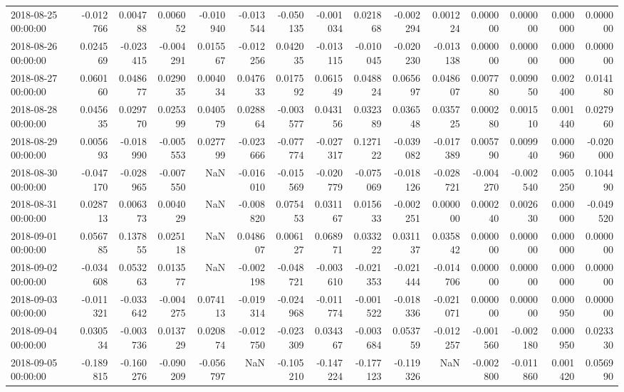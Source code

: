 \begin{tabular}{lrrrrrrrrrrrrrr}
2018-08-25 00:00:00 & -0.012766 & 0.004788 & 0.006052 & -0.010940 & -0.013544 & -0.050135 & -0.001034 & 0.021868 & -0.002294 & 0.001224 & 0.000000 & 0.000000 & 0.000000 & 0.000000 \\
2018-08-26 00:00:00 & 0.024569 & -0.023415 & -0.004291 & 0.015567 & -0.012256 & 0.042035 & -0.013115 & -0.010045 & -0.020230 & -0.013138 & 0.000000 & 0.000000 & 0.000000 & 0.000000 \\
2018-08-27 00:00:00 & 0.060160 & 0.048677 & 0.029035 & 0.004034 & 0.047633 & 0.017592 & 0.061549 & 0.048824 & 0.065697 & 0.048607 & 0.007780 & 0.009050 & 0.002400 & 0.014180 \\
2018-08-28 00:00:00 & 0.045635 & 0.029770 & 0.025399 & 0.040579 & 0.028864 & -0.003577 & 0.043156 & 0.032389 & 0.036548 & 0.035725 & 0.000280 & 0.001510 & 0.001440 & 0.027960 \\
2018-08-29 00:00:00 & 0.005693 & -0.018990 & -0.005553 & 0.027799 & -0.023666 & -0.077774 & -0.027317 & 0.127122 & -0.039082 & -0.017389 & 0.005790 & 0.009940 & 0.000960 & -0.020000 \\
2018-08-30 00:00:00 & -0.047170 & -0.028965 & -0.007550 & NaN & -0.016010 & -0.015569 & -0.020779 & -0.075069 & -0.018126 & -0.028721 & -0.004270 & -0.002540 & 0.005250 & 0.104490 \\
2018-08-31 00:00:00 & 0.028713 & 0.006373 & 0.004029 & NaN & -0.008820 & 0.075453 & 0.031167 & 0.015633 & -0.002251 & 0.000000 & 0.000240 & 0.002630 & 0.000000 & -0.049520 \\
2018-09-01 00:00:00 & 0.056785 & 0.137855 & 0.025118 & NaN & 0.048607 & 0.006127 & 0.068971 & 0.033222 & 0.031137 & 0.035842 & 0.000000 & 0.000000 & 0.000000 & 0.000000 \\
2018-09-02 00:00:00 & -0.034608 & 0.053263 & 0.013577 & NaN & -0.002198 & -0.048721 & -0.003610 & -0.021353 & -0.021444 & -0.014706 & 0.000000 & 0.000000 & 0.000000 & 0.000000 \\
2018-09-03 00:00:00 & -0.011321 & -0.033642 & -0.004275 & 0.074113 & -0.019314 & -0.024968 & -0.011774 & -0.001522 & -0.018336 & -0.021071 & 0.000000 & 0.000000 & 0.000950 & 0.000000 \\
2018-09-04 00:00:00 & 0.030534 & -0.003736 & 0.013729 & 0.020874 & -0.012750 & -0.023309 & 0.034367 & -0.003684 & 0.053759 & -0.012257 & -0.001560 & -0.002180 & 0.000950 & 0.023330 \\
2018-09-05 00:00:00 & -0.189815 & -0.160276 & -0.090209 & -0.056797 & NaN & -0.105210 & -0.147224 & -0.177123 & -0.119326 & NaN & -0.002800 & -0.011860 & 0.001420 & 0.056990 \\

\end{tabular}
